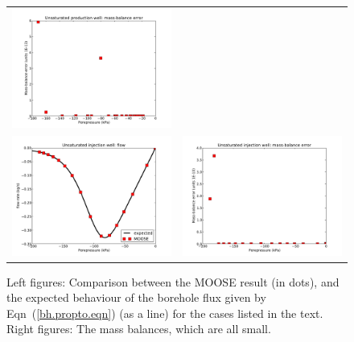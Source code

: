\documentclass[]{scrreprt}
\begin{document}
\begin{figure}[htb]
\begin{tabular}{cc}
\includegraphics[width=7cm]{bh04_error.pdf} \\
\includegraphics[width=7cm]{bh05_flow.pdf} &
\includegraphics[width=7cm]{bh05_error.pdf} \\
\end{tabular}
\caption{Left figures: Comparison between the MOOSE result (in dots), and the
  expected behaviour of the borehole flux given by
  Eqn~(\ref{bh.propto.eqn}) (as a line) for the cases listed in the
  text.  Right
  figures: The mass balances, which are all small.}
\label{bh02_05.fig}
\end{figure}
\end{document}
